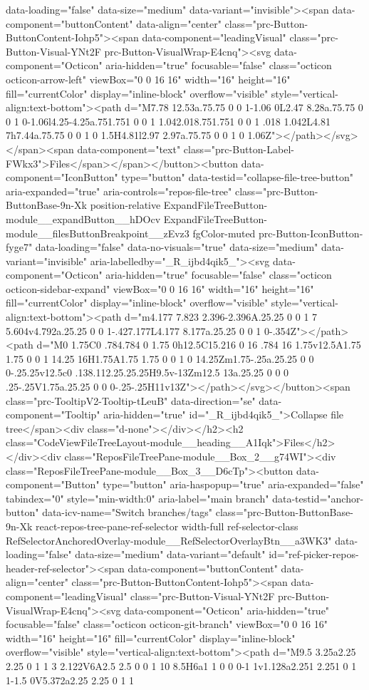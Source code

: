 {{{{{{{data-loading="false" data-size="medium" data-variant="invisible"><span data-component="buttonContent" data-align="center" class="prc-Button-ButtonContent-Iohp5"><span data-component="leadingVisual" class="prc-Button-Visual-YNt2F prc-Button-VisualWrap-E4cnq"><svg data-component="Octicon" aria-hidden="true" focusable="false" class="octicon octicon-arrow-left" viewBox="0 0 16 16" width="16" height="16" fill="currentColor" display="inline-block" overflow="visible" style="vertical-align:text-bottom"><path d="M7.78 12.53a.75.75 0 0 1-1.06 0L2.47 8.28a.75.75 0 0 1 0-1.06l4.25-4.25a.751.751 0 0 1 1.042.018.751.751 0 0 1 .018 1.042L4.81 7h7.44a.75.75 0 0 1 0 1.5H4.81l2.97 2.97a.75.75 0 0 1 0 1.06Z"></path></svg></span><span data-component="text" class="prc-Button-Label-FWkx3">Files</span></span></button><button data-component="IconButton" type="button" data-testid="collapse-file-tree-button" aria-expanded="true" aria-controls="repos-file-tree" class="prc-Button-ButtonBase-9n-Xk position-relative ExpandFileTreeButton-module__expandButton__hDOcv ExpandFileTreeButton-module__filesButtonBreakpoint__zEvz3 fgColor-muted prc-Button-IconButton-fyge7" data-loading="false" data-no-visuals="true" data-size="medium" data-variant="invisible" aria-labelledby="_R_ijbd4qik5_"><svg data-component="Octicon" aria-hidden="true" focusable="false" class="octicon octicon-sidebar-expand" viewBox="0 0 16 16" width="16" height="16" fill="currentColor" display="inline-block" overflow="visible" style="vertical-align:text-bottom"><path d="m4.177 7.823 2.396-2.396A.25.25 0 0 1 7 5.604v4.792a.25.25 0 0 1-.427.177L4.177 8.177a.25.25 0 0 1 0-.354Z"></path><path d="M0 1.75C0 .784.784 0 1.75 0h12.5C15.216 0 16 .784 16 1.75v12.5A1.75 1.75 0 0 1 14.25 16H1.75A1.75 1.75 0 0 1 0 14.25Zm1.75-.25a.25.25 0 0 0-.25.25v12.5c0 .138.112.25.25.25H9.5v-13Zm12.5 13a.25.25 0 0 0 .25-.25V1.75a.25.25 0 0 0-.25-.25H11v13Z"></path></svg></button><span class="prc-TooltipV2-Tooltip-tLeuB" data-direction="se" data-component="Tooltip" aria-hidden="true" id="_R_ijbd4qik5_">Collapse file tree</span><div class="d-none"></div></h2><h2 class="CodeViewFileTreeLayout-module__heading__A1Iqk">Files</h2></div><div class="ReposFileTreePane-module__Box_2__g74WI"><div class="ReposFileTreePane-module__Box_3__D6cTp"><button data-component="Button" type="button" aria-haspopup="true" aria-expanded="false" tabindex="0" style="min-width:0" aria-label="main branch" data-testid="anchor-button" data-icv-name="Switch branches/tags" class="prc-Button-ButtonBase-9n-Xk react-repos-tree-pane-ref-selector width-full ref-selector-class RefSelectorAnchoredOverlay-module__RefSelectorOverlayBtn__a3WK3" data-loading="false" data-size="medium" data-variant="default" id="ref-picker-repos-header-ref-selector"><span data-component="buttonContent" data-align="center" class="prc-Button-ButtonContent-Iohp5"><span data-component="leadingVisual" class="prc-Button-Visual-YNt2F prc-Button-VisualWrap-E4cnq"><svg data-component="Octicon" aria-hidden="true" focusable="false" class="octicon octicon-git-branch" viewBox="0 0 16 16" width="16" height="16" fill="currentColor" display="inline-block" overflow="visible" style="vertical-align:text-bottom"><path d="M9.5 3.25a2.25 2.25 0 1 1 3 2.122V6A2.5 2.5 0 0 1 10 8.5H6a1 1 0 0 0-1 1v1.128a2.251 2.251 0 1 1-1.5 0V5.372a2.25 2.25 0 1 1 }}}}}}}
